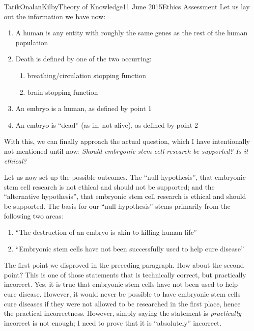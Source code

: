 \documentclass[a4paper,12pt]{article}
\begin{document}
\begin{mla}{Tarik}{Onalan}{Kilby}{Theory of Knowledge}{11 June 2015}{Ethics Assessment}
            Let us lay out the information we have now:
            \begin{enumerate}
                \item A human is any entity with roughly the same genes as the rest of the human population
                \item Death is defined by one of the two occurring:
                \begin{enumerate}
                    \item breathing/circulation stopping function
                    \item brain stopping function
                \end{enumerate}
                \item An embryo is a human, as defined by point 1
                \item An embryo is ``dead'' (as in, not alive), as defined by point 2
            \end{enumerate}
            With this, we can finally approach the actual question, which I have intentionally not
            mentioned until now: \textit{Should embryonic stem cell research be supported? Is it
            ethical?}

            Let us now set up the possible outcomes. The ``null hypothesis'', that embryonic stem cell
            research is not ethical and should not be supported; and the ``alternative hypothesis'',
            that embryonic stem cell research is ethical and should be supported. The basis for our
            ``null hypothesis'' stems primarily from the following two areas:
            \begin{enumerate}
                \item ``The destruction of an embryo is akin to killing human life''
                \item ``Embryonic stem cells have not been successfully used to help cure disease''
            \end{enumerate}
            \cite{beliefs}

            The first point we disproved in the preceding paragraph. How about the second point? This
            is one of those statements that is technically correct, but practically incorrect. Yes,
            it is true that embryonic stem cells have not been used to help cure disease. However, it
            would never be possible to have embryonic stem cells cure diseases if they were not allowed
            to be researched in the first place, hence the practical incorrectness. However, simply
            saying the statement is \textit{practically} incorrect is not enough; I need to prove that
            it is ``absolutely'' incorrect.


\end{mla}
\end{document}
